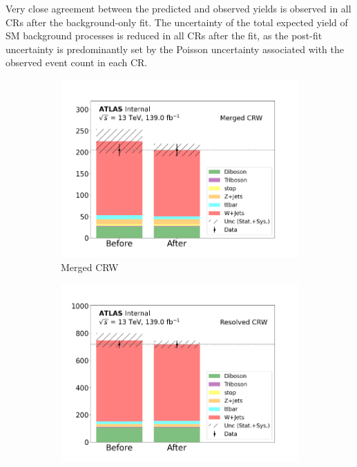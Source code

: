 Very close agreement between the predicted and observed yields is observed in all CRs after the background-only fit. The uncertainty of the total expected yield of SM background processes is reduced in all CRs after the fit, as the post-fit uncertainty is predominantly set by the Poisson uncertainty associated with the observed event count in each CR.

\begin{figure}[h]
  \centering
  \begin{subfigure}{0.45\textwidth}
    \includegraphics[width=\textwidth]{Figures/8/CRW_Merged_before_after.pdf}
    \caption{Merged CRW}\label{fig:before_after_CRW_merged}
  \end{subfigure} \hspace{1em}
  \begin{subfigure}{0.45\textwidth}
    \includegraphics[width=\textwidth]{Figures/8/CRW_Resolved_before_after.pdf}

\end{subfigure}
\end{figure}
